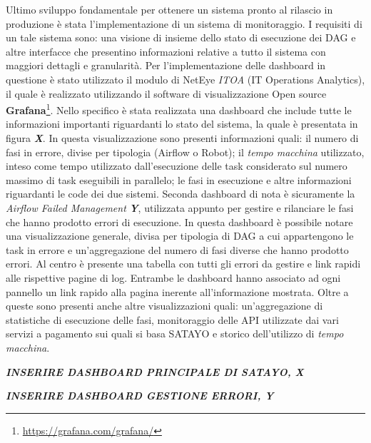 Ultimo sviluppo fondamentale per ottenere un sistema pronto al rilascio in produzione
è stata l'implementazione di un sistema di monitoraggio. I requisiti di un tale
sistema sono: una visione di insieme dello stato di esecuzione dei DAG e altre interfacce
che presentino informazioni relative a tutto il sistema con maggiori dettagli e granularità.
Per l'implementazione delle dashboard in questione è stato utilizzato il modulo
di NetEye \textit{ITOA} (IT Operations Analytics), il quale è realizzato
utilizzando il software di visualizzazione Open source \textbf{Grafana}\footnote{\url{https://grafana.com/grafana/}}.
Nello specifico è stata realizzata una dashboard che include tutte le informazioni
importanti riguardanti lo stato del sistema, la quale è presentata in figura
\textbf{\textit{X}}. In questa visualizzazione sono presenti informazioni quali:
il numero di fasi in errore, divise per tipologia (Airflow o Robot); il \textit{tempo
macchina} utilizzato, inteso come tempo utilizzato dall'esecuzione delle task considerato
sul numero massimo di task eseguibili in parallelo; le fasi in esecuzione e
altre informazioni riguardanti le code dei due sistemi. Seconda dashboard di nota
è sicuramente la \textit{Airflow Failed Management} \textbf{\textit{Y}},
utilizzata appunto per gestire e rilanciare le fasi che hanno prodotto errori di
esecuzione. In questa dashboard è possibile notare una visualizzazione generale,
divisa per tipologia di DAG a cui appartengono le task in errore e un'aggregazione
del numero di fasi diverse che hanno prodotto errori. Al centro è presente una tabella
con tutti gli errori da gestire e link rapidi alle rispettive pagine di log.
Entrambe le dashboard hanno associato ad ogni pannello un link rapido alla
pagina inerente all'informazione mostrata. Oltre a queste sono presenti anche altre
visualizzazioni quali: un'aggregazione di statistiche di esecuzione delle fasi, monitoraggio
delle API utilizzate dai vari servizi a pagamento sui quali si basa SATAYO e storico
dell'utilizzo di \textit{tempo macchina}.

\textbf{\textit{INSERIRE DASHBOARD PRINCIPALE DI SATAYO, X}}

\textbf{\textit{INSERIRE DASHBOARD GESTIONE ERRORI, Y}}